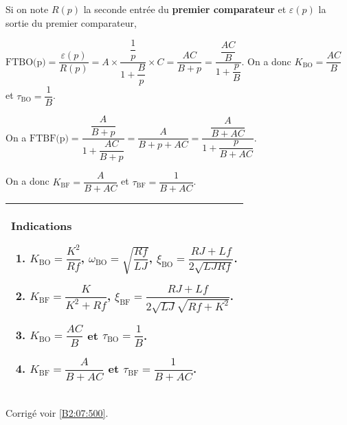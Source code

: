 \ifprof
Si on note $R(p)$ la seconde entrée du \textbf{premier comparateur} et $\varepsilon(p)$ la sortie du premier comparateur,  

$\text{FTBO(p)}=\dfrac{\varepsilon(p)}{R(p)} = A \times \dfrac{\dfrac{1}{p}}{1+\dfrac{B}{p}}\times C = \dfrac{AC}{B+p} = \dfrac{\dfrac{AC}{B}}{1+\dfrac{p}{B}}$.
On a donc $K_{\text{BO}}=\dfrac{AC}{B}$ et $\tau_{\text{BO}}=\dfrac{1}{B}$.

\else 
\fi

 
\ifprof
On a
$\text{FTBF(p)} = \dfrac{\dfrac{A}{B+p}}{1+\dfrac{AC}{B+p}}=\dfrac{A}{B+p+AC}=\dfrac{\dfrac{A}{B+AC}}{1+\dfrac{p}{B+AC}}$.

On a donc $K_{\text{BF}}=\dfrac{A}{B+AC}$ et $\tau_{\text{BF}}=\dfrac{1}{B+AC}$.

\else 
\fi




 

\ifprof
\else
\footnotesize

\noindent
\begin{tabular}{|p{.9\linewidth}|}
\hline
Indications
\begin{enumerate}
\item $K_{\text{BO}}=\dfrac{K^2}{Rf}$, 
$\omega_{\text{BO}} = \sqrt{\dfrac{Rf}{LJ}}$,
$\xi_{\text{BO}} =\dfrac{RJ+Lf}{2\sqrt{LJRf}}$.
\item $K_{\text{BF}}=\dfrac{K}{K^2+Rf}$, 
$\xi_{\text{BF}}=\dfrac{RJ+Lf}{2\sqrt{LJ}\sqrt{Rf+K^2}}$.
\item $K_{\text{BO}}=\dfrac{AC}{B}$ et $\tau_{\text{BO}}=\dfrac{1}{B}$.
\item $K_{\text{BF}}=\dfrac{A}{B+AC}$ et $\tau_{\text{BF}}=\dfrac{1}{B+AC}$.
\end{enumerate} \\
\hline
\end{tabular}
\normalsize
\begin{flushright}
\footnotesize{Corrigé  voir \ref{B2:07:500}.}
\end{flushright}%
\fi